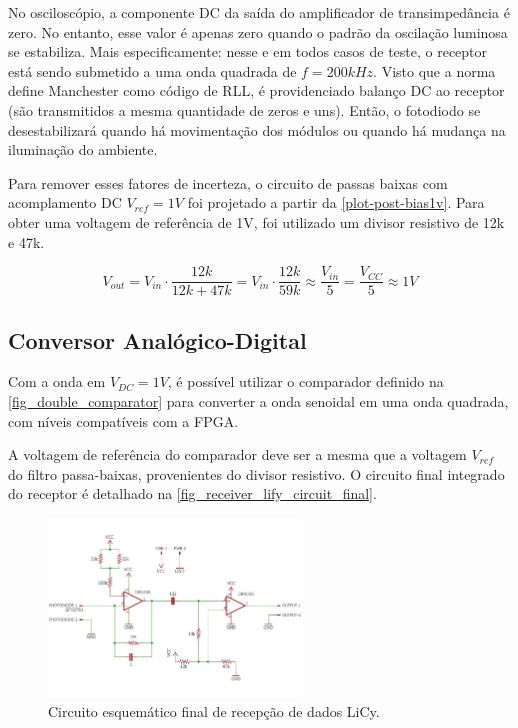 	No osciloscópio, a componente DC da saída do amplificador de transimpedância é zero. No entanto, esse valor é apenas zero quando o padrão da oscilação luminosa se estabiliza. Mais especificamente: nesse e em todos casos de teste, o receptor está sendo submetido a uma onda quadrada de $f = 200kHz$. Visto que a norma define Manchester como código de RLL, é providenciado balanço DC ao receptor (são transmitidos a mesma quantidade de zeros e uns). Então, o fotodiodo se desestabilizará quando há movimentação dos módulos ou quando há mudança na iluminação do ambiente.
	
	Para remover esses fatores de incerteza, o circuito de passas baixas com acomplamento DC $V_{ref} = 1V$ foi projetado a partir da \autoref{plot-post-bias1v}. Para obter uma voltagem de referência de 1V, foi utilizado um divisor resistivo de 12k e 47k. 
	
	\begin{equation}
	V_{out} = V_{in} \cdot \frac{12k}{12k + 47k} = V_{in} \cdot \frac{12k}{59k} \approx \frac{V_{in}}{5} = \frac{V_{CC}}{5} \approx 1V
	\end{equation}
	
	\subsection{Conversor Analógico-Digital}
	
	Com a onda em $V_{DC} = 1V$, é possível utilizar o comparador definido na \autoref{fig_double_comparator} para converter a onda senoidal em uma onda quadrada, com níveis compatíveis com a FPGA.
	
	A voltagem de referência do comparador deve ser a mesma que a voltagem $V_{ref}$ do filtro passa-baixas, provenientes do divisor resistivo. O circuito final integrado do receptor é detalhado na \autoref{fig_receiver_lify_circuit_final}.

	\begin{figure}[h]
		\caption{\label{fig_receiver_lify_circuit_final}Circuito esquemático final de recepção de dados LiCy.}
		\centering
		\includegraphics[width=0.6\textwidth, trim={0cm 1cm 0cm 1cm}, clip]{circuits/receiver_lify_final.pdf}
	\end{figure}
	
